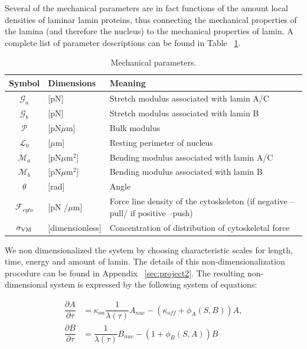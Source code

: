 Several of the mechanical parameters are in fact functions of the amount local densities of laminar lamin proteins, thus connecting the mechanical properties of the lamina (and therefore the nucleus) to the mechanical properties of lamin. A complete list of parameter descriptions can be found in Table ~\ref{tab:nucmodelparameters}.

\begin{table}[t!]
\caption{Mechanical parameters.}\centering \label{tab:nucmodelparameters} 
\begin{tabular}{ c  l  l}
\hline
Symbol & Dimensions & Meaning \\
\hline
$\mathcal{G}_a $ & [pN]  & Stretch modulus associated with lamin A/C \\
$\mathcal{G}_b$& [pN] & Stretch modulus associated with lamin B\\
$\mathcal{P}$ & [pN$\mu$m] & Bulk modulus \\
$\mathcal{L}_0$  & [$\mu$m] & Resting perimeter of nucleus\\
$\mathcal{M}_a$ & [pN$\mu$m$^2$] &  Bending modulus associated with lamin A/C\\
$\mathcal{M}_b $ & [pN$\mu$m$^2$] &  Bending modulus associated with lamin B\\
$\theta$ &  [rad] & Angle \\
$\mathcal{F}_{cyto}$ & [pN /$\mu$m] & Force line density of the cytoskeleton (if negative --pull/ if positive --push)\\
$\sigma_{\rm VM}$ & [dimensionless] & Concentration of distribution of cytoskeletal force\\
\hline
\end{tabular}
\end{table}


We non dimensionalized the system by choosing characteristic scales for length, time, energy and amount of lamin. The details of this non-dimensionalization procedure can be found in Appendix ~\ref{sec:project2}. The resulting non-dimensional system is expressed by the following system of equations:

\begin{align}
\dfrac{\partial A}{\partial \tau} &= \kappa_{on}\dfrac{1}{\lambda (\tau)} A_{nuc}  - (\kappa_{off}+ \phi_A (S,B)) A,  \\[10pt]
\dfrac{\partial B}{\partial \tau} &= \dfrac{1}{\lambda (\tau)} B_{nuc}  - (1+ \phi_B (S,A)) B  \\[10pt]
\end{align}

